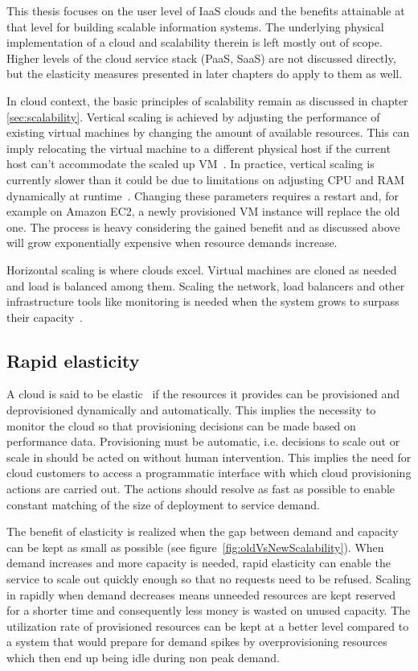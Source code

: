 \documentclass[english]{tktltiki2}
\theoremstyle{definition}
\theoremstyle{remark}
\begin{document}
This thesis focuses on the user level of IaaS clouds and the benefits attainable
at that level for building scalable information systems. The underlying physical
implementation of a cloud and scalability therein is left mostly out of scope.
Higher levels of the cloud service stack (PaaS, SaaS) are not discussed
directly, but the elasticity measures presented in later chapters do apply to
them as well.

In cloud context, the basic principles of scalability remain as discussed in
chapter \ref{sec:scalability}. Vertical scaling is achieved by adjusting the
performance of existing virtual machines by changing the amount of available
resources. This can imply relocating the virtual machine to a different physical
host if the current host can’t accommodate the scaled up
VM~\cite{Verma2010-CostOfReconfigurationInCloud}. In practice, vertical scaling
is currently slower than it could be due to limitations on adjusting CPU and RAM
dynamically at runtime~\cite{VRB11}. Changing these parameters requires a
restart and, for example on Amazon EC2, a newly provisioned VM instance will
replace the old one. The process is heavy considering the gained benefit and as
discussed above will grow exponentially expensive when resource demands
increase.

Horizontal scaling is where clouds excel. Virtual machines are cloned as needed
and load is balanced among them. Scaling the network, load balancers and other
infrastructure tools like monitoring is needed when the system grows to surpass
their capacity~\cite{VRB11}.

\subsection{Rapid elasticity}

A cloud is said to be elastic~\cite{nistdefinition} if the resources it provides
can be provisioned and deprovisioned dynamically and automatically. This implies
the necessity to monitor the cloud so that provisioning decisions can be made
based on performance data. Provisioning must be automatic, i.e. decisions to
scale out or scale in should be acted on without human intervention. This
implies the need for cloud customers to access a programmatic interface with
which cloud provisioning actions are carried out. The actions should resolve as
fast as possible to enable constant matching of the size of deployment to
service demand.

The benefit of elasticity is realized when the gap between demand and capacity
can be kept as small as possible (see figure~\ref{fig:oldVsNewScalability}). When
demand increases and more capacity is needed, rapid elasticity can enable the
service to scale out quickly enough so that no requests need to be refused.
Scaling in rapidly when demand decreases means unneeded resources are kept
reserved for a shorter time and consequently less money is wasted on unused
capacity. The utilization rate of provisioned resources can be kept at a better
level compared to a system that would prepare for demand spikes by
overprovisioning resources which then end up being idle during non peak demand.
\end{document}
